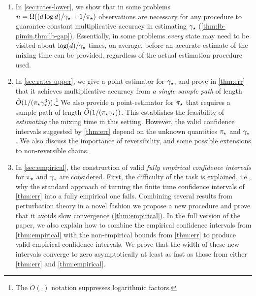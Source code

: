 \begin{enumerate}[leftmargin=1em]
  \item
    In \cref{sec:rates-lower}, we show that in some problems 
    $n = \Omega( (d\log d)/\gamma_{\star} + 1/\pi_{\star})$ observations are necessary for any procedure
    to guarantee constant multiplicative accuracy in estimating $\gamma_{\star}$
    (\cref{thm:lb-pimin,thm:lb-gap}).
    Essentially, in some problems \emph{every} state may need to be visited about
    $\log(d)/\gamma_{\star}$ times, on average, before an accurate estimate of
    the mixing time can be provided, regardless of the actual estimation
    procedure used.

  \item
    In \cref{sec:rates-upper}, we give a point-estimator for $\gamma_{\star}$,
    and prove in \cref{thm:err} that it achieves multiplicative
    accuracy from \emph{a single sample path} of length
    $\tilde{O}(1/(\pi_{\star}\gamma_{\star}^3))$.\footnote{The
    $\tilde{O}(\cdot)$ notation suppresses logarithmic factors.}
    We also provide a point-estimator for $\pi_{\star}$ that requires a sample
    path of length $\tilde{O}(1/(\pi_{\star}\gamma_{\star}))$.
    This establishes the feasibility of \emph{estimating} the mixing
    time in this setting.
    However, the valid confidence intervals suggested by
    \cref{thm:err} depend on the unknown quantities $\pi_{\star}$ and
    $\gamma_{\star}$.
    We also discuss the importance of reversibility, and some possible
    extensions to non-reversible chains.

  \item
    In \cref{sec:empirical}, the construction of
    valid \emph{fully empirical confidence intervals} for $\pi_{\star}$ and
    $\gamma_{\star}$ are considered. First, the difficulty of the task is explained,
    i.e., why the standard approach of turning the finite time confidence intervals of
    \cref{thm:err} into a fully empirical one fails.
	Combining several results from perturbation theory in a novel fashion
	we propose a new procedure and prove that it avoids slow convergence
    (\cref{thm:empirical}).
    In the full version of the paper,
    we also explain how to combine the empirical confidence intervals
    from \cref{thm:empirical} with the non-empirical bounds from
    \cref{thm:err} to produce valid empirical confidence intervals.
    We prove that the width of these new
    intervals converge to zero asymptotically at least as fast as
    those from either \cref{thm:err} and \cref{thm:empirical}.

\end{enumerate}

